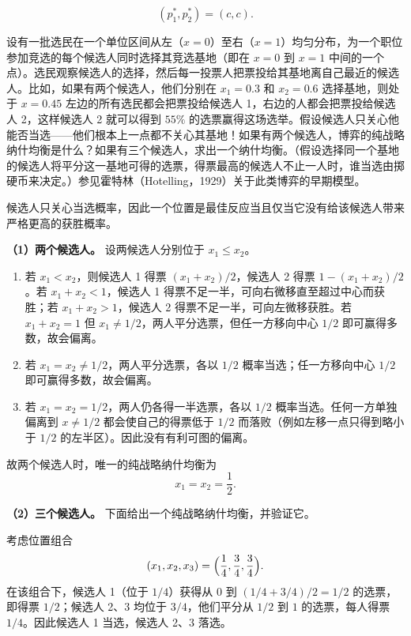 \[
  \boxed{(p_1^*,p_2^*)=(c,c)}.
\]

设有一批选民在一个单位区间从左（$x=0$）至右（$x=1$）均匀分布，为一个职位参加竞选的每个候选人同时选择其竞选基地（即在 $x=0$ 到 $x=1$ 中间的一个点）。选民观察候选人的选择，然后每一投票人把票投给其基地离自己最近的候选人。比如，如果有两个候选人，他们分别在 $x_1=0.3$ 和 $x_2=0.6$ 选择基地，则处于 $x=0.45$ 左边的所有选民都会把票投给候选人 1，右边的人都会把票投给候选人 2，这样候选人 2 就可以得到 $55\%$ 的选票赢得这场选举。假设候选人只关心他能否当选——他们根本上一点都不关心其基地！如果有两个候选人，博弈的纯战略纳什均衡是什么？如果有三个候选人，求出一个纳什均衡。（假设选择同一个基地的候选人将平分这一基地可得的选票，得票最高的候选人不止一人时，谁当选由掷硬币来决定。）参见霍特林（Hotelling，1929）关于此类博弈的早期模型。

\sol
候选人只关心当选概率，因此一个位置是最佳反应当且仅当它没有给该候选人带来严格更高的获胜概率。

\textbf{（1）两个候选人。} 设两候选人分别位于 $x_1\le x_2$。
\begin{enumerate}[leftmargin=2em]
  \item 若 $x_1<x_2$，则候选人 1 得票 $(x_1+x_2)/2$，候选人 2 得票 $1-(x_1+x_2)/2$。若 $x_1+x_2<1$，候选人 1 得票不足一半，可向右微移直至超过中心而获胜；若 $x_1+x_2>1$，候选人 2 得票不足一半，可向左微移获胜。若 $x_1+x_2=1$ 但 $x_1\ne1/2$，两人平分选票，但任一方移向中心 $1/2$ 即可赢得多数，故会偏离。
  \item 若 $x_1=x_2\ne1/2$，两人平分选票，各以 $1/2$ 概率当选；任一方移向中心 $1/2$ 即可赢得多数，故会偏离。
  \item 若 $x_1=x_2=1/2$，两人仍各得一半选票，各以 $1/2$ 概率当选。任何一方单独偏离到 $x\ne1/2$ 都会使自己的得票低于 $1/2$ 而落败（例如左移一点只得到略小于 $1/2$ 的左半区）。因此没有有利可图的偏离。
\end{enumerate}
故两个候选人时，唯一的纯战略纳什均衡为
\[
  \boxed{x_1=x_2=\frac12}.
\]

\textbf{（2）三个候选人。} 下面给出一个纯战略纳什均衡，并验证它。

考虑位置组合
\[
  \boxed{(x_1,x_2,x_3)=\Bigl(\frac14,\frac34,\frac34\Bigr)}.
\]\indent
在该组合下，候选人 1（位于 $1/4$）获得从 $0$ 到 $(1/4+3/4)/2=1/2$ 的选票，即得票 $1/2$；候选人 2、3 均位于 $3/4$，他们平分从 $1/2$ 到 $1$ 的选票，每人得票 $1/4$。因此候选人 1 当选，候选人 2、3 落选。

